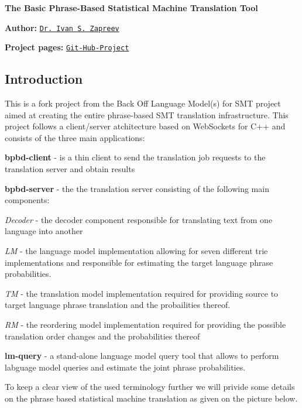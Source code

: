{\bfseries The Basic Phrase-\/\+Based Statistical Machine Translation Tool}

{\bfseries Author\+:} \href{https://nl.linkedin.com/in/zapreevis}{\tt Dr. Ivan S. Zapreev}

{\bfseries Project pages\+:} \href{https://github.com/ivan-zapreev/Back-Off-Language-Model-SMT}{\tt Git-\/\+Hub-\/\+Project}

\subsection*{Introduction}

This is a fork project from the Back Off Language Model(s) for S\+M\+T project aimed at creating the entire phrase-\/based S\+M\+T translation infrastructure. This project follows a client/server atchitecture based on Web\+Sockets for C++ and consists of the three main applications\+:


\begin{DoxyItemize}
\item {\bfseries bpbd-\/client} -\/ is a thin client to send the translation job requests to the translation server and obtain results
\item {\bfseries bpbd-\/server} -\/ the the translation server consisting of the following main components\+:
\begin{DoxyItemize}
\item {\itshape Decoder} -\/ the decoder component responsible for translating text from one language into another
\item {\itshape L\+M} -\/ the language model implementation allowing for seven different trie implementations and responsible for estimating the target language phrase probabilities.
\item {\itshape T\+M} -\/ the translation model implementation required for providing source to target language phrase translation and the probailities thereof.
\item {\itshape R\+M} -\/ the reordering model implementation required for providing the possible translation order changes and the probabilities thereof
\end{DoxyItemize}
\item {\bfseries lm-\/query} -\/ a stand-\/alone language model query tool that allows to perform labguage model queries and estimate the joint phrase probabilities.
\end{DoxyItemize}

To keep a clear view of the used terminology further we will privide some details on the phrase based statistical machine translation as given on the picture below.



